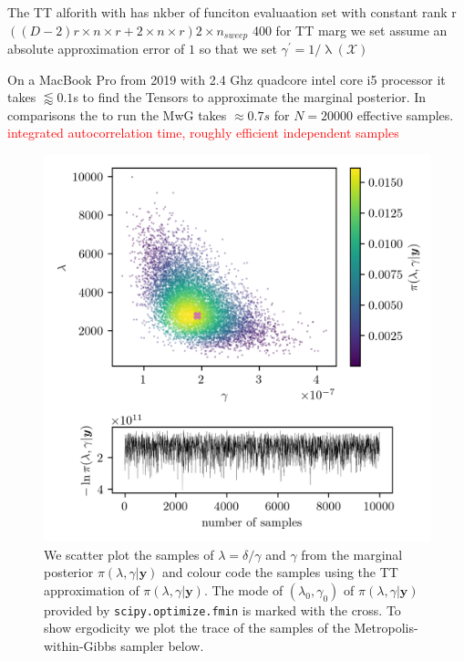 The TT alforith with has nkber of funciton evaluaation set with constant rank r 
$( (D-2) r \times n\times r + 2  \times n \times r)2 \times n_{sweep}$
400 for TT marg
we set assume an absolute approximation error of $1$ so that we set $\gamma^{\prime} = 1 / \uplambda(\mathcal{X}) $

On a MacBook Pro from 2019 with 2.4 Ghz quadcore intel core i5 processor it takes $\lessapprox  0.1$s to find the Tensors to approximate the marginal posterior.
In comparisons the to run the MwG takes $\approx 0.7s$ for $N = 20000$ effective samples.
\textcolor{red}{integrated autocorrelation time, roughly efficient independent samples}
\begin{figure}[ht!]
	\centering
	\includegraphics{ScatterplusHistoPlusTT.png}
	\caption[Scatter plot of samples from marginal posterior, including weighting from TT approximation; additional trace plot of the marginal posterior samples.]{We scatter plot the samples of $\lambda = \delta / \gamma $ and $\gamma$ from the marginal posterior $\pi(\lambda , \gamma  | \bm{y})$ and colour code the samples using the TT approximation of $\pi(\lambda , \gamma  | \bm{y})$. The mode of $(\lambda_0 , \gamma_0)$ of $\pi(\lambda , \gamma  | \bm{y})$ provided by \texttt{scipy.optimize.fmin} is marked with the cross. To show ergodicity we plot the trace of the samples of the Metropolis-within-Gibbs sampler below.}
	\label{fig:ScatterPlotTT}
\end{figure}


